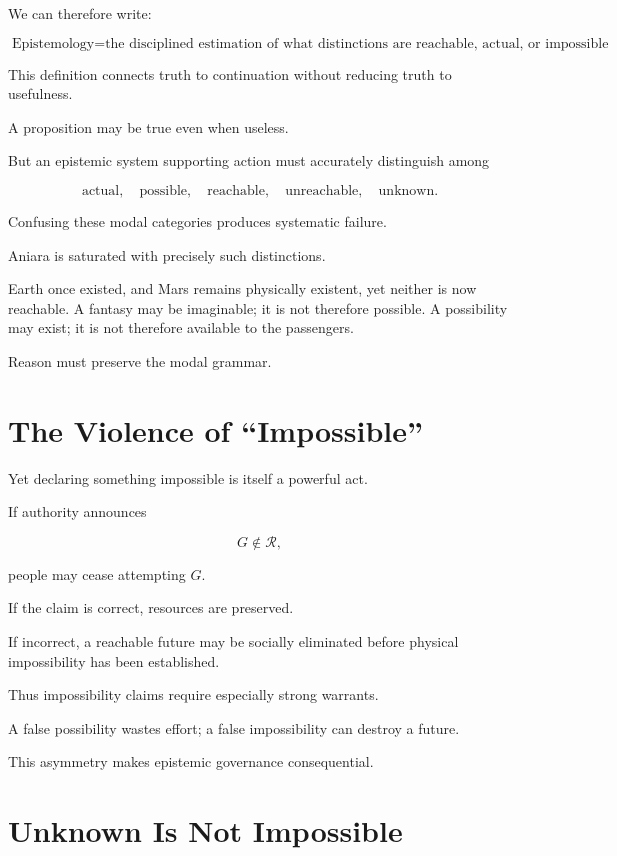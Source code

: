 \documentclass[11pt,oneside]{book}
\theoremstyle{definition}
\theoremstyle{remark}
\newcommand{\R}{\mathcal{R}}
\begin{document}
We can therefore write:

\[
\boxed{
\text{Epistemology}
=
\text{the disciplined estimation of what distinctions are reachable, actual, or impossible under specified conditions.}
}
\]

This definition connects truth to continuation without reducing truth to usefulness.

A proposition may be true even when useless.

But an epistemic system supporting action must accurately distinguish among

\[
\text{actual},
\quad
\text{possible},
\quad
\text{reachable},
\quad
\text{unreachable},
\quad
\text{unknown}.
\]

Confusing these modal categories produces systematic failure.

Aniara is saturated with precisely such distinctions.

Earth once existed, and Mars remains physically existent, yet neither is now reachable. A fantasy may be imaginable; it is not therefore possible. A possibility may exist; it is not therefore available to the passengers.

Reason must preserve the modal grammar.

\section{The Violence of ``Impossible''}

Yet declaring something impossible is itself a powerful act.

If authority announces

\[
G\notin\R,
\]

people may cease attempting \(G\).

If the claim is correct, resources are preserved.

If incorrect, a reachable future may be socially eliminated before physical impossibility has been established.

Thus impossibility claims require especially strong warrants.

A false possibility wastes effort; a false impossibility can destroy a future.

This asymmetry makes epistemic governance consequential.

\section{Unknown Is Not Impossible}
\end{document}
